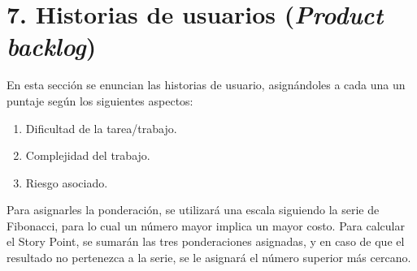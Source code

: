 \documentclass[
11pt, %
codirector, %
]{charter}
\begin{document}
\section{7. Historias de usuarios (\textit{Product backlog})}
\label{sec:backlog}

En esta sección se enuncian las historias de usuario, asignándoles a cada una un puntaje según los siguientes aspectos:
    \begin{enumerate}
        \item Dificultad de la tarea/trabajo.
        \item Complejidad del trabajo.
        \item Riesgo asociado.
    \end{enumerate}

Para asignarles la ponderación, se utilizará una escala siguiendo la serie de Fibonacci, para lo cual un número mayor implica un mayor costo. Para calcular el Story Point, se sumarán las tres ponderaciones asignadas, y en caso de que el resultado no pertenezca a la serie, se le asignará el número superior más cercano.
\end{document}
